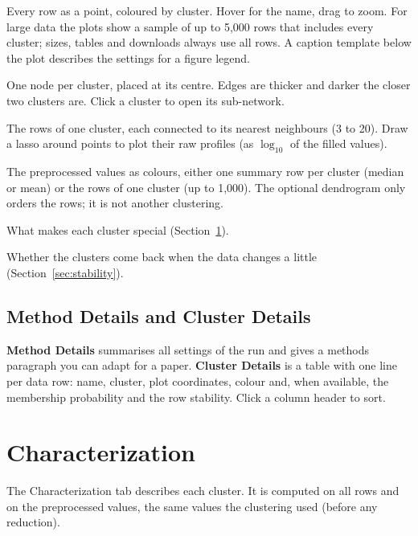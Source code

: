 \documentclass[11pt,a4paper]{article}
\newcommand{\ui}[1]{\textsf{\textbf{#1}}}   %
\begin{document}
\begin{description}[style=nextline,leftmargin=1.5em]
  \item[Scatter Plot] Every row as a point, coloured by cluster. Hover for the name, drag to zoom. For large data
    the plots show a sample of up to 5{,}000 rows that includes every cluster; sizes, tables and downloads always
    use all rows. A caption template below the plot describes the settings for a figure legend.
  \item[Clusters Network] One node per cluster, placed at its centre. Edges are thicker and darker the closer two
    clusters are. Click a cluster to open its sub-network.
  \item[Sub-network View] The rows of one cluster, each connected to its nearest neighbours (3 to 20). Draw a lasso
    around points to plot their raw profiles (as $\log_{10}$ of the filled values).
  \item[Heatmap] The preprocessed values as colours, either one summary row per cluster (median or mean) or the rows
    of one cluster (up to 1{,}000). The optional dendrogram only orders the rows; it is not another clustering.
  \item[Characterization] What makes each cluster special (Section~\ref{sec:characterization}).
  \item[Stability] Whether the clusters come back when the data changes a little (Section~\ref{sec:stability}).
\end{description}

\subsection{Method Details and Cluster Details}

\ui{Method Details} summarises all settings of the run and gives a methods paragraph you can adapt for a paper.
\ui{Cluster Details} is a table with one line per data row: name, cluster, plot coordinates, colour and, when
available, the membership probability and the row stability. Click a column header to sort.

\section{Characterization}
\label{sec:characterization}

The Characterization tab describes each cluster. It is computed on all rows and on the preprocessed values, the same
values the clustering used (before any reduction).
\end{document}
